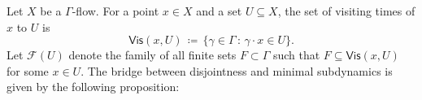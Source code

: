 \documentclass[11pt,reqno,psamsfonts]{amsart}
\theoremstyle{bfnote}
\newtheorem{lemma}[theo]{Lemma}
\theoremstyle{definition}
\theoremstyle{remark}
\newcommand{\0}{\varnothing}
\newcommand{\set}[1]{\{#1\}}
\newcommand{\defeq}{\coloneqq}
\newcommand{\bemph}[1]{{\normalfont#1}}
\newcommand{\ep}[1]{\bemph{(}#1\bemph{)}}
\newcommand{\emphd}[1]{{\fontseries{b}\selectfont\textsf{#1}}}
\newcommand{\G}{\Gamma}
\newcommand{\Vis}{\mathsf{Vis}}
\newcommand{\Ret}{\mathsf{Ret}}
\numberwithin{equation}{section}
\newenvironment{scproof}[1][]{\begin{proof}[\textsc{\upshape{Proof}}#1]}{\end{proof}}
\begin{document}



    Let $X$ be a $\G$-flow. For a point $x \in X$ and a set $U \subseteq X$, the set of \emphd{visiting times} of $x$ to $U$ is
    \[
        \Vis(x,U) \,\defeq\, \set{\gamma \in \G \,:\, \gamma \cdot x \in U}.
    \]
    Let $\mathcal{F}(U)$ denote the family of all finite sets $F \subset \G$ such that $F \subseteq \Vis(x,U)$ for some $x \in U$. The bridge between disjointness and minimal subdynamics is given by the following proposition:
\end{document}
